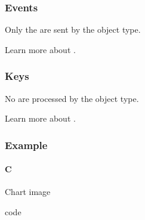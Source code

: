 \documentclass[letterpaper,10pt,english]{sphinxmanual}
\begin{document}
\subsubsection{Events}
\label{\detokenize{object-types/chart:events}}
Only the  are sent by the object type.

Learn more about {\hyperref[\detokenize{overview/events::doc}]{}}.


\subsubsection{Keys}
\label{\detokenize{object-types/chart:keys}}
No  are processed by the object type.

Learn more about {\hyperref[\detokenize{overview/indev::doc}]{}}.


\subsubsection{Example}
\label{\detokenize{object-types/chart:example}}

\paragraph{C}
\label{\detokenize{object-types/chart:c}}
Chart image

code
\end{document}
